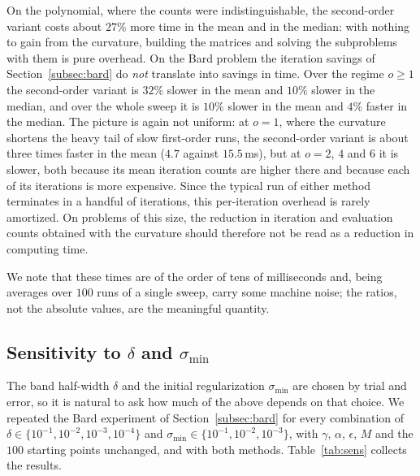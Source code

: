 \documentclass[11pt]{article}
\begin{document}
On the polynomial, where the counts were indistinguishable, the
second-order variant costs about $27\%$ more time in the mean and in the
median: with nothing to gain from the curvature, building the matrices and
solving the subproblems with them is pure overhead. On the Bard problem the
iteration savings of Section~\ref{subsec:bard} do \emph{not} translate into
savings in time. Over the regime $o \ge 1$ the second-order variant is $32\%$
slower in the mean and $10\%$ slower in the median, and over the whole sweep it
is $10\%$ slower in the mean and $4\%$ faster in the median. The picture is
again not uniform: at $o = 1$, where the curvature shortens the heavy tail of
slow first-order runs, the second-order variant is about three times faster in
the mean ($4.7$ against $15.5$\,ms), but at $o = 2$, $4$ and $6$ it is slower,
both because its mean iteration counts are higher there and because each of its
iterations is more expensive. Since the typical run of either method
terminates in a handful of iterations, this per-iteration overhead is rarely
amortized. On problems of this size, the
reduction in iteration and evaluation counts obtained with the curvature should
therefore not be read as a reduction in computing time.

We note that these times are of the order of tens of milliseconds and, being
averages over $100$ runs of a single sweep, carry some machine noise; the
ratios, not the absolute values, are the meaningful quantity.

\subsection{Sensitivity to $\delta$ and $\sigma_{\min}$} \label{subsec:sens}

The band half-width $\delta$ and the initial regularization $\sigma_{\min}$ are
chosen by trial and error, so it is natural to ask how much of the above depends
on that choice. We repeated the Bard experiment of Section~\ref{subsec:bard} for
every combination of $\delta \in \{10^{-1},10^{-2},10^{-3},10^{-4}\}$ and
$\sigma_{\min} \in \{10^{-1},10^{-2},10^{-3}\}$, with $\gamma$, $\alpha$,
$\epsilon$, $M$ and the $100$ starting points unchanged, and with both methods.
Table~\ref{tab:sens} collects the results.
\end{document}
